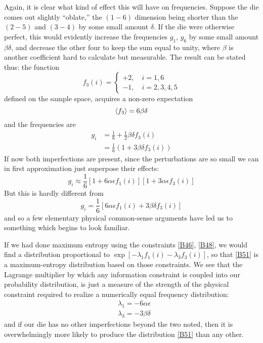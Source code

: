 Again, it is clear what kind of effect this will have on frequencies.
Suppose the die comes out slightly ``oblate,'' the $(1{-}6)$ dimension being shorter than the $(2{-}5)$ and $(3{-}4)$ by some small amount $\delta$.
If the die were otherwise perfect, this would evidently increase the frequencies $g_1$, $g_6$ by some small amount $\beta\delta$, and decrease the other four to keep the sum equal to unity, where $\beta$ is another coefficient hard to calculate but measurable. The result can be stated thus: the function
\begin{equation}
	\label{B47}
	f_3(i) =
	\begin{cases}
		+2, \quad i = 1, 6\\
		-1, \quad i = 2, 3, 4, 5
	\end{cases}
\end{equation}
defined on the sample space, acquires a non-zero expectation
\begin{equation}
	\label{B48}
	\langle f_3\rangle = 6\beta\delta
\end{equation}
and the frequencies are
\begin{equation}
	\label{B49}
	\begin{split}
		g_i
			&= \frac{1}{6} + \frac{1}{2} \beta\delta f_3(i)\\
			&= \frac{1}{6}\left(1 + 3\beta\delta f_3(i)\right)
	\end{split}
\end{equation}
If now both imperfections are present, since the perturbations are so small we can in first approximation just superpose their effects:
\begin{equation}
	\label{B50}
	g_i \approx \frac{1}{6} [1 + 6\alpha\epsilon f_1(i)][1 + 3\alpha\epsilon f_3(i)]
\end{equation}
But this is hardly different from
\begin{equation}
	\label{B51}
	g_i = \frac{1}{6}[6\alpha\epsilon f_1(i) + 3\beta\delta f_3(i)]
\end{equation}
and so a few elementary physical common-sense arguments have led us to something which begins to look familiar.

If we had done maximum entropy using the constraints \eqref{B46}, \eqref{B48}, we would find a distribution proportional to $\exp[-\lambda_1 f_1(i) - \lambda_3 f_3(i)]$, so that \eqref{B51} is a maximum-entropy distribution based on those constraints.
We see that the Lagrange multiplier by which any information constraint is coupled into our probability distribution, is just a measure of the strength of the physical constraint required to realize a numerically equal frequency distribution:
\begin{align}
	&\lambda_1 = -6\alpha\epsilon\label{B52}\\
	&\lambda_3 = -3\beta\delta\label{B53}
\end{align}
and if our die has no other imperfections beyond the two noted, then it is overwhelmingly more likely to produce the distribution \eqref{B51} than any other.

